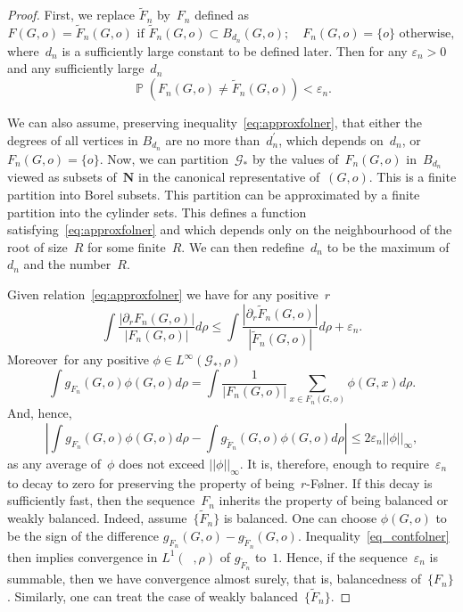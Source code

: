 \documentclass[english]{article}
\theoremstyle{definition}
\DeclareMathOperator{\mbbP}{{\mathbb{P}}}
\DeclareMathOperator{\Gr}{{\mathcal{G}_*}}
\newcommand*{\field}[1]{\mathbf{#1}} %
\newcommand*\N{\field{N}} %
\newcommand*\eps{\varepsilon}
\begin{document}
\begin{proof}
    First, we replace $\tilde F_n$ by~$F_n$ defined as 
    $$ F(G,o)= \tilde F_n(G,o) \text{ if } \tilde F_n(G,o) \subset B_{d_n}(G,o); \quad 
    F_n(G,o) = \{o\} \text{ otherwise},$$ 
    where~$d_n$ is a sufficiently large constant to be defined later. Then for any $\eps_n > 0$ and any sufficiently large~$d_n$
    \begin{equation}\label{eq:approxfolner}
        \mbbP \left( F_n(G,o) \not = \tilde F_n(G,o) \right) < \eps_n.
    \end{equation}

    We can also assume, preserving inequality~\eqref{eq:approxfolner}, that either the degrees of all vertices in $B_{d_n}$ are no more than~$d^\prime_n$, which depends on~$d_n$, or $F_n(G,o) = \{o\}$. Now, we can partition~$\mathcal{G_*}$ by the values of~$F_n(G,o)$ in~$B_{d_n}$ viewed as subsets of~$\N$ in the canonical representative of~$(G,o)$. This is a finite partition into Borel subsets. This partition can be approximated by a finite partition into the cylinder sets. This defines a function satisfying~\eqref{eq:approxfolner} and which depends only on the neighbourhood of the root of size~$R$ for some finite~$R$. We can then redefine~$d_n$ to be the maximum of~$d_n$ and the number~$R$. 

    Given relation~\eqref{eq:approxfolner} we have for any positive~$r$
    $$
     \int \frac{|\partial_r F_n (G,o)|}{|F_n(G,o)|} d\rho \le \int \frac{|\partial_r\tilde F_n (G,o)|}{|\tilde F_n(G,o)|} d\rho + \eps_n.
    $$
    Moreover~for any positive $\phi \in L^\infty(\mathcal{G}_*, \rho)$
    $$
    \int g_{F_n}(G,o)\phi(G,o) d\rho  = \int \frac{1}{|F_n(G,o)|} \sum_{x \in F_n(G,o)} \phi(G,x) d\rho.
    $$
    And, hence, 
    \begin{equation}\label{eq_contfolner}
        \left| \int g_{F_n}(G,o)\phi(G,o) d\rho  - \int g_{\tilde F_n}(G,o)\phi(G,o) d\rho \right| \le 2\eps_n ||\phi||_\infty,
    \end{equation}
    as any average of~$\phi$ does not exceed $||\phi||_\infty$. It is, therefore, enough to require~$\eps_n$ to decay to zero for preserving the property of being~$r$-F\o lner. If this decay is sufficiently fast, then the sequence~$F_n$ inherits the property of being balanced or weakly balanced. Indeed, assume~$\{\tilde F_n\}$ is balanced. One can choose $\phi (G,o)$ to be the sign of the difference $g_{F_n}(G,o) - g_{\tilde F_n}(G,o)$. Inequality~\ref{eq_contfolner} then implies convergence in $L^1(\Gr, \rho)$ of $g_{\tilde F_n}$ to~$1$. Hence, if the sequence~$\eps_n$ is summable, then we have convergence almost surely, that is, balancedness of~$\{F_n\}$. Similarly, one can treat the case of weakly balanced~$\{\tilde F_n\}$.
\end{proof}
\end{document}
